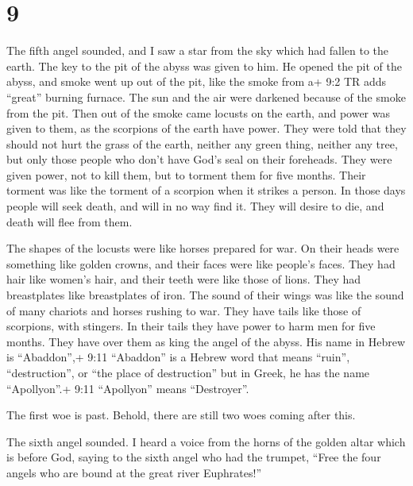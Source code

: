 \hypertarget{section-8}{%
\section{9}\label{section-8}}

 The fifth angel sounded, and I saw a star from the sky
which had fallen to the earth. The key to the pit of the abyss was given
to him.  He opened the pit of the abyss, and smoke went up
out of the pit, like the smoke from a+ 9:2 TR adds ``great'' burning
furnace. The sun and the air were darkened because of the smoke from the
pit.  Then out of the smoke came locusts on the earth, and
power was given to them, as the scorpions of the earth have power.
 They were told that they should not hurt the grass of the
earth, neither any green thing, neither any tree, but only those people
who don't have God's seal on their foreheads.  They were
given power, not to kill them, but to torment them for five months.
Their torment was like the torment of a scorpion when it strikes a
person.  In those days people will seek death, and will in
no way find it. They will desire to die, and death will flee from them.

 The shapes of the locusts were like horses prepared for
war. On their heads were something like golden crowns, and their faces
were like people's faces.  They had hair like women's hair,
and their teeth were like those of lions.  They had
breastplates like breastplates of iron. The sound of their wings was
like the sound of many chariots and horses rushing to war. 
They have tails like those of scorpions, with stingers. In their tails
they have power to harm men for five months.  They have
over them as king the angel of the abyss. His name in Hebrew is
``Abaddon'',+ 9:11 ``Abaddon'' is a Hebrew word that means ``ruin'',
``destruction'', or ``the place of destruction'' but in Greek, he has
the name ``Apollyon''.+ 9:11 ``Apollyon'' means ``Destroyer''.

 The first woe is past. Behold, there are still two woes
coming after this.

 The sixth angel sounded. I heard a voice from the horns of
the golden altar which is before God,  saying to the sixth
angel who had the trumpet, ``Free the four angels who are bound at the
great river Euphrates!''

